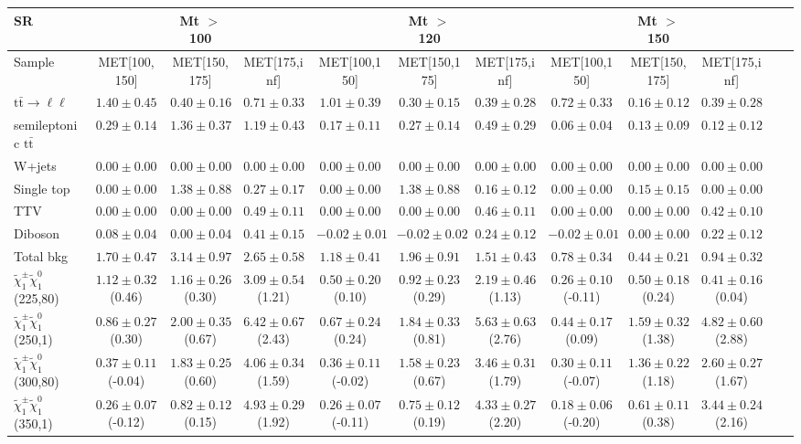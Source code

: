 \begin{table}
\begin{center}
\small
\begin{tabular}{lccccccccccc}
\hline
SR & & Mt $>$ 100 & & & Mt $>$ 120 & & &Mt $>$ 150 & & &\\
\hline
Sample&MET[100,150]&MET[150,175]&MET[175,inf]&MET[100,150]&MET[150,175]&MET[175,inf]&MET[100,150]&MET[150,175]&MET[175,inf]&\\
\hline
$\mathrm{t}\bar{\mathrm{t}}\rightarrow \ell\ell$&$1.40\pm0.45$&$0.40\pm0.16$&$0.71\pm0.33$&$1.01\pm0.39$&$0.30\pm0.15$&$0.39\pm0.28$&$0.72\pm0.33$&$0.16\pm0.12$&$0.39\pm0.28$\\
semileptonic $\mathrm{t}\bar{\mathrm{t}}$&$0.29\pm0.14$&$1.36\pm0.37$&$1.19\pm0.43$&$0.17\pm0.11$&$0.27\pm0.14$&$0.49\pm0.29$&$0.06\pm0.04$&$0.13\pm0.09$&$0.12\pm0.12$\\
W+jets&$0.00\pm0.00$&$0.00\pm0.00$&$0.00\pm0.00$&$0.00\pm0.00$&$0.00\pm0.00$&$0.00\pm0.00$&$0.00\pm0.00$&$0.00\pm0.00$&$0.00\pm0.00$\\
Single top&$0.00\pm0.00$&$1.38\pm0.88$&$0.27\pm0.17$&$0.00\pm0.00$&$1.38\pm0.88$&$0.16\pm0.12$&$0.00\pm0.00$&$0.15\pm0.15$&$0.00\pm0.00$\\
TTV&$0.00\pm0.00$&$0.00\pm0.00$&$0.49\pm0.11$&$0.00\pm0.00$&$0.00\pm0.00$&$0.46\pm0.11$&$0.00\pm0.00$&$0.00\pm0.00$&$0.42\pm0.10$\\
Diboson&$0.08\pm0.04$&$0.00\pm0.04$&$0.41\pm0.15$&$-0.02\pm0.01$&$-0.02\pm0.02$&$0.24\pm0.12$&$-0.02\pm0.01$&$0.00\pm0.00$&$0.22\pm0.12$\\
\hline
Total bkg&$1.70\pm0.47$&$3.14\pm0.97$&$2.65\pm0.58$&$1.18\pm0.41$&$1.96\pm0.91$&$1.51\pm0.43$&$0.78\pm0.34$&$0.44\pm0.21$&$0.94\pm0.32$\\
$\tilde{\chi}_{1}^{\pm}\tilde{\chi}_{1}^{0}$ (225,80)&$1.12\pm0.32$(0.46)&$1.16\pm0.26$(0.30)&$3.09\pm0.54$(1.21)&$0.50\pm0.20$(0.10)&$0.92\pm0.23$(0.29)&$2.19\pm0.46$(1.13)&$0.26\pm0.10$(-0.11)&$0.50\pm0.18$(0.24)&$0.41\pm0.16$(0.04)\\
$\tilde{\chi}_{1}^{\pm}\tilde{\chi}_{1}^{0}$ (250,1)&$0.86\pm0.27$(0.30)&$2.00\pm0.35$(0.67)&$6.42\pm0.67$(2.43)&$0.67\pm0.24$(0.24)&$1.84\pm0.33$(0.81)&$5.63\pm0.63$(2.76)&$0.44\pm0.17$(0.09)&$1.59\pm0.32$(1.38)&$4.82\pm0.60$(2.88)\\
$\tilde{\chi}_{1}^{\pm}\tilde{\chi}_{1}^{0}$ (300,80)&$0.37\pm0.11$(-0.04)&$1.83\pm0.25$(0.60)&$4.06\pm0.34$(1.59)&$0.36\pm0.11$(-0.02)&$1.58\pm0.23$(0.67)&$3.46\pm0.31$(1.79)&$0.30\pm0.11$(-0.07)&$1.36\pm0.22$(1.18)&$2.60\pm0.27$(1.67)\\
$\tilde{\chi}_{1}^{\pm}\tilde{\chi}_{1}^{0}$ (350,1)&$0.26\pm0.07$(-0.12)&$0.82\pm0.12$(0.15)&$4.93\pm0.29$(1.92)&$0.26\pm0.07$(-0.11)&$0.75\pm0.12$(0.19)&$4.33\pm0.27$(2.20)&$0.18\pm0.06$(-0.20)&$0.61\pm0.11$(0.38)&$3.44\pm0.24$(2.16)\\
\hline
\hline\hline
\end{tabular}
\end{center}
\end{table}
